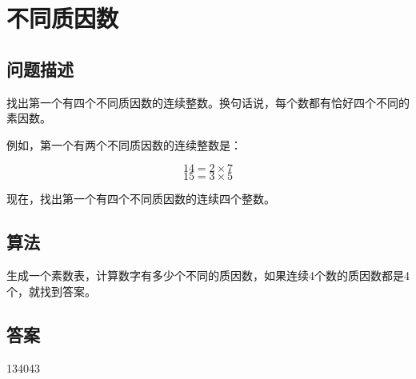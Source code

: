 \section{不同质因数}\label{sec:problem47}
\subsection{问题描述}
\begin{tcolorbox}
找出第一个有四个不同质因数的连续整数。换句话说，每个数都有恰好四个不同的素因数。 

例如，第一个有两个不同质因数的连续整数是：

\[
14 = 2 \times 7
\]
\[
15 = 3 \times 5
\]

现在，找出第一个有四个不同质因数的连续四个整数。

\end{tcolorbox}

\subsection{算法}
生成一个素数表，计算数字有多少个不同的质因数，如果连续4个数的质因数都是4个，就找到答案。


\subsection{答案}
134043
